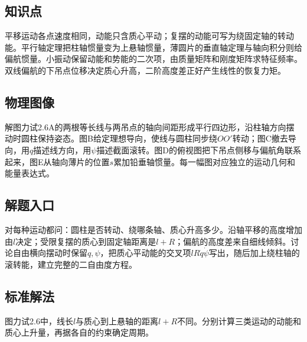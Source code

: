 \documentclass[UTF8,fontset=fandol,a4paper,11pt]{ctexart}
\begin{document}


\subsection*{知识点}

平移运动各点速度相同，动能只含质心平动；复摆的动能可写为绕固定轴的转动能。平行轴定理把柱轴惯量变为上悬轴惯量，薄圆片的垂直轴定理与轴向积分则给偏航惯量。小振动保留动能和势能的二次项，由质量矩阵和刚度矩阵求特征频率。双线偏航的下吊点位移决定质心升高，二阶高度差正好产生线性的恢复力矩。



\subsection*{物理图像}

解图力试2.6A的两根等长线与两吊点的轴向间距形成平行四边形，沿柱轴方向摆动时圆柱保持姿态。图B给定理想导向，使线与圆柱同步绕$OO'$转动；图C撤去导向，用$q$描述线方向，用$\psi$描述截面滚转。图D的俯视图把下吊点侧移与偏航角联系起来，图E从轴向薄片的位置$s$累加铅垂轴惯量。每一幅图对应独立的运动几何和能量表达式。



\subsection*{解题入口}

对每种运动都问：圆柱是否转动、绕哪条轴、质心升高多少。沿轴平移的高度增加由$l$决定；受限复摆的质心到固定轴距离是$l+R$；偏航的高度差来自细线倾斜。讨论自由横向摆动时保留$q,\psi$，把质心平动能的交叉项$lR\dot q\dot\psi$写出，随后加上绕柱轴的滚转能，建立完整的二自由度方程。



\subsection*{标准解法}


图力试2.6中，线长$l$与质心到上悬轴的距离$l+R$不同。分别计算三类运动的动能和质心上升量，再据各自的约束确定周期。
\end{document}
